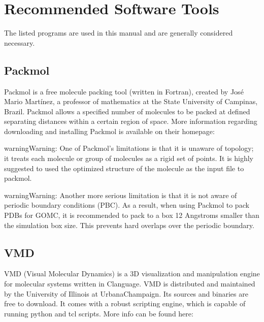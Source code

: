 \documentclass[letterpaper,10pt,english]{sphinxmanual}
\begin{document}
\chapter{Recommended Software Tools}
\label{\detokenize{software_tools:recommended-software-tools}}\label{\detokenize{software_tools::doc}}
\sphinxAtStartPar
The listed programs are used in this manual and are generally considered necessary.


\section{Packmol}
\label{\detokenize{software_tools:packmol}}
\sphinxAtStartPar
Packmol is a free molecule packing tool (written in Fortran), created by José Mario Martínez, a professor of mathematics at the State University of Campinas, Brazil. Packmol allows a specified number of molecules to be packed at defined separating distances within a certain region of space. More information regarding downloading and installing Packmol is available on their homepage:

\sphinxAtStartPar
{}

\begin{sphinxadmonition}{warning}{Warning:}
\sphinxAtStartPar
One of Packmol’s limitations is that it is unaware of topology; it treats each molecule or group of molecules as a rigid set of points. It is highly suggested to used the optimized structure of the molecule as the input file to packmol.
\end{sphinxadmonition}

\begin{sphinxadmonition}{warning}{Warning:}
\sphinxAtStartPar
Another more serious limitation is that it is not aware of periodic boundary conditions (PBC). As a result, when using Packmol to pack PDBs for GOMC, it is recommended to pack to a box 1\sphinxhyphen{}2 Angstroms smaller than the simulation box size. This prevents hard overlaps over the periodic boundary.
\end{sphinxadmonition}


\section{VMD}
\label{\detokenize{software_tools:vmd}}
\sphinxAtStartPar
VMD (Visual Molecular Dynamics) is a 3\sphinxhyphen{}D visualization and manipulation engine for molecular systems written in C\sphinxhyphen{}language. VMD is distributed and maintained by the University of Illinois at Urbana\sphinxhyphen{}Champaign. Its sources and binaries are free to download. It comes with a robust scripting engine, which is capable of running python and tcl scripts. More info can be found here:
\end{document}

